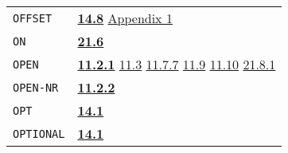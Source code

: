 \documentclass[a4paper,]{article}
\begin{document}
\begin{longtable}[]{@{}ll@{}}
\begin{minipage}[t]{0.24\columnwidth}
\texttt{OFFSET}\strut
\end{minipage} & \begin{minipage}[t]{0.70\columnwidth}\raggedright\strut
\textbf{\href{14-data-type-declarations.md\#148-offset}{14.8}}
\href{appendix-1-a-look-inside.md\#appendix-1-a-look-inside}{Appendix 1}\strut
\end{minipage}\tabularnewline
\begin{minipage}[t]{0.24\columnwidth}\raggedright\strut
\texttt{ON}\strut
\end{minipage} & \begin{minipage}[t]{0.70\columnwidth}\raggedright\strut
\textbf{\href{21-interrupts.md\#216-other-subrs}{21.6}}\strut
\end{minipage}\tabularnewline
\begin{minipage}[t]{0.24\columnwidth}\raggedright\strut
\texttt{OPEN}\strut
\end{minipage} & \begin{minipage}[t]{0.70\columnwidth}\raggedright\strut
\textbf{\href{11-input-output.md\#1121-open}{11.2.1}} \href{11-input-output.md\#113-end-of-file-routine}{11.3}
\href{11-input-output.md\#1177-reset}{11.7.7} \href{11-input-output.md\#119-internal-channels}{11.9}
\href{11-input-output.md\#1110-the-net-device-the-arpa-network}{11.10}
\href{21-interrupts.md\#2181-char-received}{21.8.1}\strut
\end{minipage}\tabularnewline
\begin{minipage}[t]{0.24\columnwidth}\raggedright\strut
\texttt{OPEN-NR}\strut
\end{minipage} & \begin{minipage}[t]{0.70\columnwidth}\raggedright\strut
\textbf{\href{11-input-output.md\#1122-open-nr}{11.2.2}}\strut
\end{minipage}\tabularnewline
\begin{minipage}[t]{0.24\columnwidth}\raggedright\strut
\texttt{OPT}\strut
\end{minipage} & \begin{minipage}[t]{0.70\columnwidth}\raggedright\strut
\textbf{\href{14-data-type-declarations.md\#141-patterns}{14.1}}\strut
\end{minipage}\tabularnewline
\begin{minipage}[t]{0.24\columnwidth}\raggedright\strut
\texttt{OPTIONAL}\strut
\end{minipage} & \begin{minipage}[t]{0.70\columnwidth}\raggedright\strut
\textbf{\href{14-data-type-declarations.md\#141-patterns}{14.1}}\strut

\end{minipage}
\end{longtable}
\end{document}
